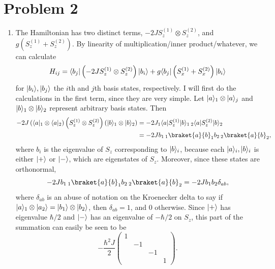 \documentclass[11pt, letterpaper]{article}
\begin{document}
\section*{Problem 2}
\begin{enumerate}
	\item The Hamiltonian has two distinct terms, $-2JS_z^{(1)} \otimes S_z^{(2)} $, and $g\left( S_z^{(1)} +S_z^{(2)}  \right) $. By linearity of multiplication/inner product/whatever, we can calculate 
		\[
			H_{ij} =\langle b_j\rvert \left( -2J S_z^{(1)} \otimes S_z^{(2)}  \right) \lvert b_i\rangle +g\langle b_j\rvert \left( S_x^{(1)} +S_x^{(2)}  \right) \lvert b_i\rangle
		\]
		for $\lvert b_i\rangle ,\lvert b_j\rangle $ the $i$th and $j$th basis states, respectively. I will first do the calculations in the first term, since they are very simple. Let $\lvert a\rangle_1 \otimes \lvert a\rangle_j$ and $\lvert b\rangle_1 \otimes \lvert b\rangle_2$ represent arbitrary basis states. Then
		\begin{align*}
			-2J\left( \bra{a}_1 \otimes \bra{a}_2 \right) \left( S_z^{(1)} \otimes S_z^{(2)}  \right) \left( \ket{b}_1 \otimes \ket{b}_2 \right) &=-2J_1\bra{a}S_z^{(1)} \ket{b}_1\,_2\bra{a}S_z^{(2)} \ket{b}_2\\
																			     &=-2Jb_1\,_1\braket{a}{b}_1b_2\,_2\braket{a}{b}_2
		,\end{align*}
		where $b_i$ is the eigenvalue of $S_z$ corresponding to $\lvert b\rangle_i$, because each $\lvert a\rangle_i,\lvert b\rangle_i$ is either $\lvert+\rangle $ or $\lvert-\rangle $, which are eigenstates of $S_z$. Moreover, since these states are orthonormal,
\[
	-2Jb_1\,_1\braket{a}{b}_1b_2\,_2\braket{a}{b}_2=-2Jb_1b_2 \delta_{ab},
\]
where $\delta_{ab} $ is an abuse of notation on the Kroenecker delta to say if $\lvert a\rangle_1 \otimes \lvert a_2\rangle =\lvert b_1\rangle \otimes \lvert b_2\rangle $, then $\delta_{ab} =1$, and $0$ otherwise. Since $\lvert+\rangle $ has eigenvalue $\hbar /2$ and $\lvert-\rangle $ has an eigenvalue of $-\hbar /2$ on $S_z$, this part of the summation can easily be seen to be
		\[
			-\frac{\hbar^2 J}{2} \begin{pmatrix}
			1 &  &  &  \\
			 & -1 &  &  \\
			 &  & -1 &  \\
			 &  &  & 1
			\end{pmatrix}
		.\]


\end{enumerate}
\end{document}
